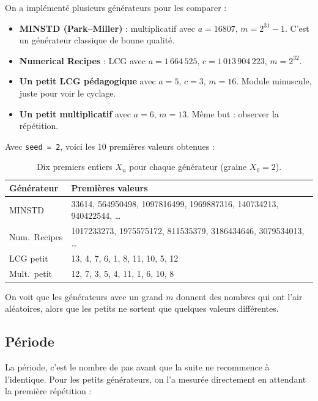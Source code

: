 \documentclass[11pt,a4paper]{article}
\begin{document}
On a impl\'ement\'e plusieurs g\'en\'erateurs pour les comparer :
\begin{itemize}
    \item \textbf{MINSTD (Park--Miller)} : multiplicatif avec $a = 16807$,
          $m = 2^{31} - 1$. C'est un g\'en\'erateur classique de bonne
          qualit\'e.
    \item \textbf{Numerical Recipes} : LCG avec $a = 1\,664\,525$,
          $c = 1\,013\,904\,223$, $m = 2^{32}$.
    \item \textbf{Un petit LCG p\'edagogique} avec $a = 5$, $c = 3$, $m = 16$.
          Module minuscule, juste pour voir le cyclage.
    \item \textbf{Un petit multiplicatif} avec $a = 6$, $m = 13$. M\^eme but :
          observer la r\'ep\'etition.
\end{itemize}

Avec \texttt{seed = 2}, voici les 10 premi\`eres valeurs obtenues :

\begin{table}[H]
\centering
\small
\caption{Dix premiers entiers $X_n$ pour chaque g\'en\'erateur (graine $X_0 = 2$).}
\begin{tabular}{lp{10cm}}
\toprule
\textbf{G\'en\'erateur} & \textbf{Premi\`eres valeurs} \\
\midrule
MINSTD          & 33614, 564950498, 1097816499, 1969887316, 140734213, 940422544, \dots \\
Num.\ Recipes   & 1017233273, 1975575172, 811535379, 3186434646, 3079534013, \dots \\
LCG petit       & 13, 4, 7, 6, 1, 8, 11, 10, 5, 12 \\
Mult.\ petit    & 12, 7, 3, 5, 4, 11, 1, 6, 10, 8 \\
\bottomrule
\end{tabular}
\end{table}

On voit que les g\'en\'erateurs avec un grand $m$ donnent des nombres \og qui ont
l'air al\'eatoires\fg{}, alors que les petits ne sortent que quelques valeurs
diff\'erentes.

\subsection{P\'eriode}

La p\'eriode, c'est le nombre de pas avant que la suite ne recommence \`a
l'identique. Pour les petits g\'en\'erateurs, on l'a mesur\'ee directement en
attendant la premi\`ere r\'ep\'etition :
\end{document}
